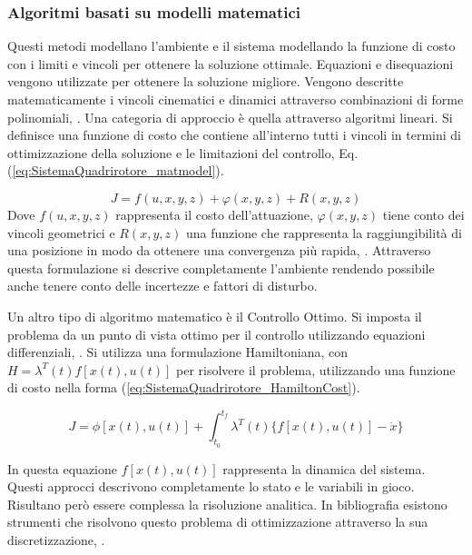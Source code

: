 \subsubsection{Algoritmi basati su modelli matematici}
Questi metodi modellano l'ambiente  e il sistema modellando la funzione di costo con i limiti e vincoli per ottenere la soluzione ottimale. Equazioni e disequazioni vengono utilizzate per ottenere la soluzione migliore.
Vengono descritte matematicamente i vincoli cinematici e dinamici attraverso combinazioni di forme polinomiali, \cite{YangLiang2016SoR3}. 
Una categoria di approccio è quella attraverso algoritmi lineari. Si definisce una funzione di costo che contiene all'interno tutti i vincoli in termini di ottimizzazione della soluzione e le limitazioni del controllo, Eq. (\ref{eq:SistemaQuadrirotore_matmodel}).

\begin{equation}\label{eq:SistemaQuadrirotore_matmodel}
	J = f(u,x,y,z) + \varphi(x,y,z) + R(x,y,z)
\end{equation}
Dove $f(u,x,y,z)$ rappresenta il costo dell'attuazione, $\varphi(x,y,z)$ tiene conto dei vincoli geometrici e $R(x,y,z)$ una funzione che rappresenta la raggiungibilità di una posizione in modo da ottenere una convergenza più rapida, \cite{YangLiang2016SoR3}.
Attraverso questa formulazione si descrive completamente l'ambiente rendendo possibile anche tenere conto delle incertezze e fattori di disturbo.

Un altro tipo di algoritmo matematico è il Controllo Ottimo. Si imposta il problema da un punto di vista ottimo per il controllo utilizzando equazioni differenziali, \cite{AndersonS.J2009Auat}. Si utilizza una formulazione Hamiltoniana, con $H = \lambda^T(t) f\left[x(t),u(t)\right]$ per risolvere il problema, utilizzando una funzione di costo nella forma (\ref{eq:SistemaQuadrirotore_HamiltonCost}).

\begin{equation}\label{eq:SistemaQuadrirotore_HamiltonCost}
	J = \phi \left[x(t),u(t) \right] + \int_{t_0}^{t_f} \lambda^T(t) \{f\left[x(t),u(t)\right]-\dot{x}\} 
\end{equation}

In questa equazione $f\left[x(t),u(t)\right]$ rappresenta la dinamica del sistema.
Questi approcci descrivono completamente lo stato e le variabili in gioco. Risultano però essere complessa la risoluzione analitica. In bibliografia esistono strumenti che risolvono questo problema di ottimizzazione attraverso la sua discretizzazione, \cite{TricaudChristophe2010Aamf}.

